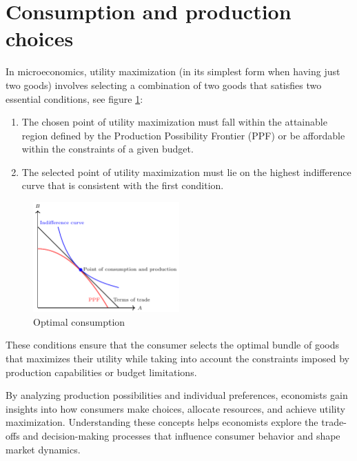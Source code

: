 \documentclass[
  12pt,
  oneside]{book}
\providecommand{\tightlist}{%
  \setlength{\itemsep}{0pt}\setlength{\parskip}{0pt}}
\theoremstyle{definition}
\theoremstyle{definition}
\theoremstyle{definition}
\theoremstyle{definition}
\theoremstyle{remark}
\begin{document}
\hypertarget{consumption-and-production-choices}{%
\section{Consumption and production choices}\label{consumption-and-production-choices}}

In microeconomics, utility maximization (in its simplest form when having just two goods) involves selecting a combination of two goods that satisfies two essential conditions, see figure \ref{fig:optimalconsumption}:

\begin{enumerate}
\def\labelenumi{\arabic{enumi}.}
\tightlist
\item
  The chosen point of utility maximization must fall within the attainable region defined by the Production Possibility Frontier (PPF) or be affordable within the constraints of a given budget.
\item
  The selected point of utility maximization must lie on the highest indifference curve that is consistent with the first condition.
\end{enumerate}

\begin{figure}
\centering
\includegraphics[width=0.5\textwidth,height=\textheight]{fig/optimalconsumption.png}
\caption{\label{fig:optimalconsumption} Optimal consumption}
\end{figure}

These conditions ensure that the consumer selects the optimal bundle of goods that maximizes their utility while taking into account the constraints imposed by production capabilities or budget limitations.

By analyzing production possibilities and individual preferences, economists gain insights into how consumers make choices, allocate resources, and achieve utility maximization. Understanding these concepts helps economists explore the trade-offs and decision-making processes that influence consumer behavior and shape market dynamics.
\end{document}
